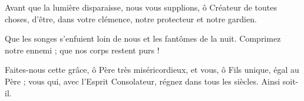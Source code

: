 Avant que la lumière disparaisse,
nous vous supplions, ô Créateur de toutes choses,
d’être, dans votre clémence,
notre protecteur et notre gardien.

Que les songes s’enfuient loin de nous
et les fantômes de la nuit.
Comprimez notre ennemi ;
que nos corps restent purs !

Faites-nous cette grâce, ô Père très miséricordieux,
et vous, ô Fils unique, égal au Père ;
vous qui, avec l’Esprit Consolateur,
régnez dans tous les siècles.
Ainsi soit-il.